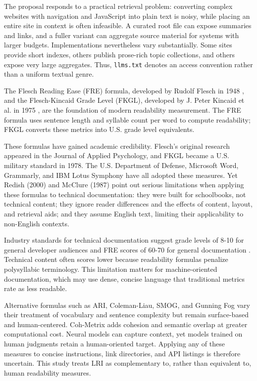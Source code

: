 \documentclass[10pt,conference,a4paper]{IEEEtran}
\makeatletter
\def\subsection{\@startsection{subsection}{2}{\z@}{6pt}{3pt}{\normalfont\normalsize\itshape}}
\makeatother
\begin{document}
The proposal responds to a practical retrieval problem: converting complex websites with navigation and JavaScript into plain text is noisy, while placing an entire site in context is often infeasible. A curated root file can expose summaries and links, and a fuller variant can aggregate source material for systems with larger budgets. Implementations nevertheless vary substantially. Some sites provide short indexes, others publish prose-rich topic collections, and others expose very large aggregates. Thus, \texttt{llms.txt} denotes an access convention rather than a uniform textual genre.

\subsection{Traditional Readability Metrics}

The Flesch Reading Ease (FRE) formula, developed by Rudolf Flesch in 1948 \cite{Flesch1948}, and the Flesch-Kincaid Grade Level (FKGL), developed by J. Peter Kincaid et al. in 1975 \cite{Kincaid1975}, are the foundation of modern readability measurement. The FRE formula uses sentence length and syllable count per word to compute readability; FKGL converts these metrics into U.S. grade level equivalents.

These formulas have gained academic credibility. Flesch's original research appeared in the Journal of Applied Psychology, and FKGL became a U.S. military standard in 1978. The U.S. Department of Defense, Microsoft Word, Grammarly, and IBM Lotus Symphony have all adopted these measures. Yet Redish (2000) \cite{Redish2000} and McClure (1987) \cite{McClure1987} point out serious limitations when applying these formulas to technical documentation: they were built for schoolbooks, not technical content; they ignore reader differences and the effects of content, layout, and retrieval aids; and they assume English text, limiting their applicability to non-English contexts.

Industry standards for technical documentation suggest grade levels of 8-10 for general developer audiences and FRE scores of 60-70 for general documentation \cite{Kincaid1988}. Technical content often scores lower because readability formulas penalize polysyllabic terminology. This limitation matters for machine-oriented documentation, which may use dense, concise language that traditional metrics rate as less readable.

Alternative formulas such as ARI, Coleman-Liau, SMOG, and Gunning Fog vary their treatment of vocabulary and sentence complexity but remain surface-based and human-centered. Coh-Metrix adds cohesion and semantic overlap at greater computational cost. Neural models can capture context, yet models trained on human judgments retain a human-oriented target. Applying any of these measures to concise instructions, link directories, and API listings is therefore uncertain. This study treats LRI as complementary to, rather than equivalent to, human readability measures.
\end{document}
